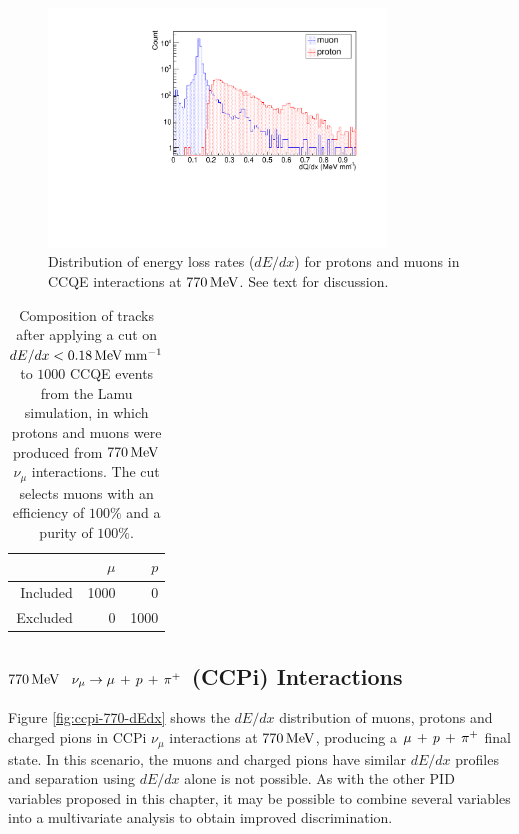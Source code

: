 \begin{figure}
    \centering
    \includegraphics[angle=-90,width=0.8\textwidth]{chapters/particleid_images/ccqe-770-dQdx}
    \caption[$dE/dx$ distribution for $\mu$, $p$ from $770\MeV$ $\nu_\mu$]{\label{fig:ccqe-770-dEdx}Distribution of energy loss rates ($dE/dx$) for protons and muons in \acs{CCQE} interactions at $770\MeV$. See text for discussion.}
\end{figure}

\begin{table}
    \centering
    \begin{tabular}{*{3}{r}}
        & $\mu$ & $p$ \\
        \hline
        \hline
        Included & 1000 & 0 \\
        Excluded & 0 & 1000 \\
        \hline
    \end{tabular}
    \caption[Composition of tracks after cut on $dE/dx$ for $770\MeV$ \acs{CCQE} events]{\label{table:ccqe-770-dedx-cut}Composition of tracks after applying a cut on $dE/dx < 0.18 \,\mathrm{MeV}\,\mathrm{mm}^{-1}$ to $1000$ \acs{CCQE} events from the Lamu simulation, in which protons and muons were produced from $770\MeV$ $\nu_\mu$ interactions. The cut selects muons with an efficiency of $100\%$ and a purity of $100\%$.}
\end{table}

\subsection{$770\MeV$ $\nu_\mu \rightarrow \mu\,+\,p\,+\,\pi^{+}$ (\acs{CCPi}) Interactions}
Figure \ref{fig:ccpi-770-dEdx} shows the $dE/dx$ distribution of muons, protons and charged pions in \acs{CCPi} $\nu_\mu$ interactions at $770\MeV$, producing a $\mu\,+\,p\,+\,\pi^{+}$ final state. In this scenario, the muons and charged pions have similar $dE/dx$ profiles and separation using $dE/dx$ alone is not possible. As with the other PID variables proposed in this chapter, it may be possible to combine several variables into a multivariate analysis to obtain improved discrimination.

